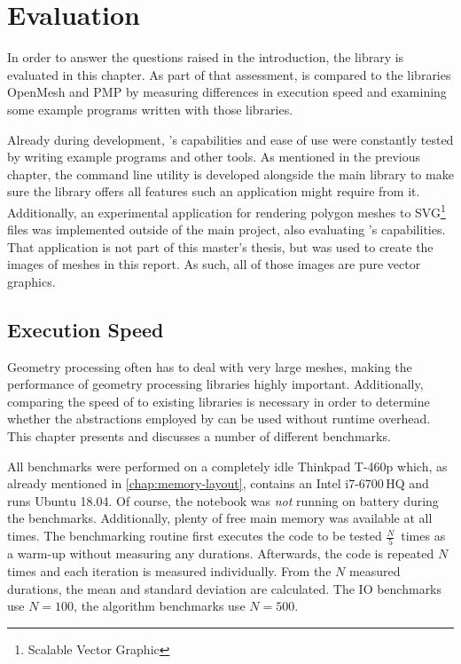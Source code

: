 \chapter{Evaluation}
\label{chap:evaluation}

In order to answer the questions raised in the introduction, the library  is evaluated in this chapter.
As part of that assessment,  is compared to the \cpp libraries OpenMesh and PMP by measuring differences in execution speed and examining some example programs written with those libraries.

Already during development, 's capabilities and ease of use were constantly tested by writing example programs and other tools.
As mentioned in the previous chapter, the command line utility  is developed alongside the main library to make sure the library offers all features such an application might require from it.
Additionally, an experimental application for rendering polygon meshes to SVG\footnote{Scalable Vector Graphic} files was implemented outside of the main project, also evaluating 's capabilities.
That application is not part of this master's thesis, but was used to create the images of meshes in this report.
As such, all of those images are pure vector graphics.


\section{Execution Speed}

Geometry processing often has to deal with very large meshes, making the performance of geometry processing libraries highly important.
Additionally, comparing the speed of  to existing libraries is necessary in order to determine whether the abstractions employed by  can be used without runtime overhead.
This chapter presents and discusses a number of different benchmarks.

All benchmarks were performed on a completely idle \textsf{Thinkpad T-460p} which, as already mentioned in \autoref{chap:memory-layout}, contains an \textsf{Intel i7-6700\,HQ} and runs \textsf{Ubuntu 18.04}.
Of course, the notebook was \emph{not} running on battery during the benchmarks.
Additionally, plenty of free main memory was available at all times.
The benchmarking routine first executes the code to be tested $\frac{N}{5}$~times as a warm-up without measuring any durations.
Afterwards, the code is repeated $N$ times and each iteration is measured individually.
From the $N$ measured durations, the mean and standard deviation are calculated.
The IO benchmarks use $N = 100$, the algorithm benchmarks use $N = 500$.

